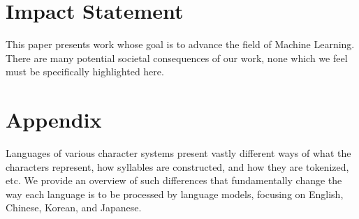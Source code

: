 \documentclass{article}
\theoremstyle{plain}
\theoremstyle{definition}
\theoremstyle{remark}
\begin{document}
\section*{Impact Statement}
This paper presents work whose goal is to advance the field of 
Machine Learning. There are many potential societal consequences 
of our work, none which we feel must be specifically highlighted here.


\nocite{langley00}





\appendix
\section{Appendix}\label{appendix}
Languages of various character systems present vastly different ways of what the characters represent, how syllables are constructed, and how they are tokenized, etc.
We provide an overview of such differences that fundamentally change the way each language is to be processed by language models, focusing on English, Chinese, Korean, and Japanese.
\end{document}
